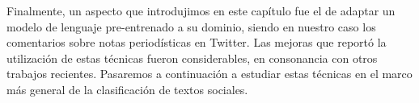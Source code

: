 Finalmente, un aspecto que introdujimos en este capítulo fue el de adaptar un modelo de lenguaje pre-entrenado a su dominio, siendo en nuestro caso los comentarios sobre notas periodísticas en Twitter. Las mejoras que reportó la utilización de estas técnicas fueron considerables, en consonancia con otros trabajos recientes. Pasaremos a continuación a estudiar estas técnicas en el marco más general de la clasificación de textos sociales.